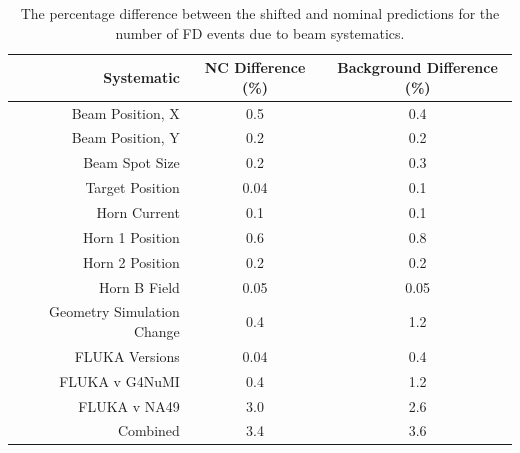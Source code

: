 \begin{table}[h]
  \begin{center}
    \caption[Beam Systematic Errors]{The percentage difference between the shifted and nominal predictions for the number of FD events due to beam systematics.}
    \label{tab:SystBeam}
    \begin{tabular}{r c c}
      \hline\hline
      Systematic & NC Difference (\%) & Background Difference (\%) \\
      \hline
      Beam Position, X & 0.5 & 0.4 \\
      Beam Position, Y & 0.2 & 0.2 \\
      Beam Spot Size & 0.2 & 0.3 \\
      Target Position & 0.04 & 0.1 \\
      Horn Current & 0.1 & 0.1 \\
      Horn 1 Position & 0.6 & 0.8 \\
      Horn 2 Position & 0.2 & 0.2 \\
      Horn B Field & 0.05 & 0.05 \\
      Geometry Simulation Change & 0.4 & 1.2 \\
      FLUKA Versions & 0.04 & 0.4 \\
      FLUKA v G4NuMI & 0.4 & 1.2 \\
      FLUKA v NA49 & 3.0 & 2.6 \\
      \hline
      Combined & 3.4 & 3.6 \\
      \hline
    \end{tabular}
  \end{center}
\end{table}

